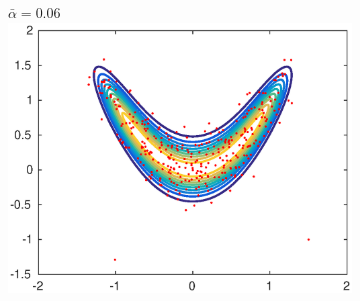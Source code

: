 \documentclass{beamer}
\begin{document}
\begin{frame}
\begin{figure}[t]
\begin{subfigure}{0.32\linewidth}
		\end{subfigure}
		\begin{subfigure}{0.32\linewidth}
			\centering
			\tiny{$\bar \alpha = 0.06$}
			\includegraphics[width=1\linewidth]{../plots/MHvsRAM/MH_big}
		\end{subfigure}
		

\end{figure}
\end{frame}
\end{document}
